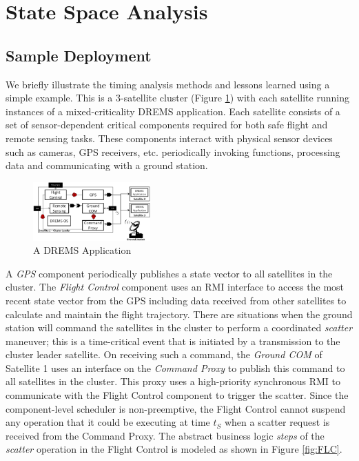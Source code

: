 \section{State Space Analysis}
\label{sec:State_Space_Analysis}

\subsection{Sample Deployment}

We briefly illustrate the timing analysis methods and lessons learned using a simple example. This is a 3-satellite cluster (Figure \ref{fig:CT}) with each satellite running instances of a mixed-criticality DREMS application. Each satellite consists of a set of sensor-dependent critical components required for both safe flight and remote sensing tasks. These components interact with physical sensor devices such as cameras, GPS receivers, etc. periodically invoking functions, processing data and communicating with a ground station. 

\vspace{-0.1in}
\begin{figure}[htb]
	\centering
	\includegraphics[width=0.40\textwidth]{figs/Case_Study_Fixed.png}
	\caption{A DREMS Application}
	\label{fig:CT}
\end{figure}

A \emph{GPS} component periodically publishes a state vector to all satellites in the cluster. The \emph{Flight Control} component uses an RMI interface to access the most recent state vector from the GPS including data received from other satellites to calculate and maintain the flight trajectory. %
There are situations when the ground station will command the satellites in the cluster to perform a coordinated \emph{scatter} maneuver; this is a time-critical event that is initiated by a transmission to the cluster leader satellite. On receiving such a command, the \emph{Ground COM} of Satellite 1 uses an interface on the \emph{Command Proxy} to publish this command to all satellites in the cluster. This proxy uses a high-priority synchronous RMI to communicate with the Flight Control component to trigger the scatter. Since the component-level scheduler is non-preemptive, the Flight Control cannot suspend any operation that it could be executing at time $t_S$ when a scatter request is received from the Command Proxy. %
The abstract business logic \emph{steps} of the \emph{scatter} operation in the Flight Control is modeled as shown in Figure \ref{fig:FLC}.

